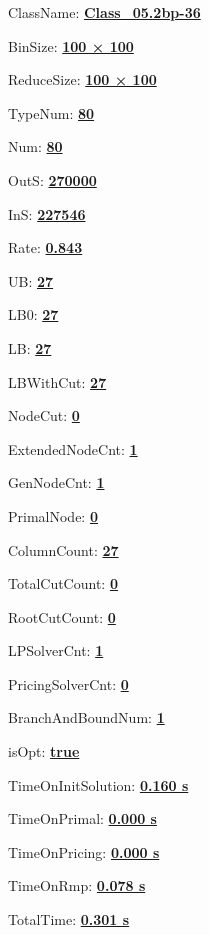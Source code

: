 \documentclass[11pt]{article}
\begin{document}
\pagestyle{empty}


ClassName: \underline{\textbf{Class_05.2bp-36}}
\par
BinSize: \underline{\textbf{100 × 100}}
\par
ReduceSize: \underline{\textbf{100 × 100}}
\par
TypeNum: \underline{\textbf{80}}
\par
Num: \underline{\textbf{80}}
\par
OutS: \underline{\textbf{270000}}
\par
InS: \underline{\textbf{227546}}
\par
Rate: \underline{\textbf{0.843}}
\par
UB: \underline{\textbf{27}}
\par
LB0: \underline{\textbf{27}}
\par
LB: \underline{\textbf{27}}
\par
LBWithCut: \underline{\textbf{27}}
\par
NodeCut: \underline{\textbf{0}}
\par
ExtendedNodeCnt: \underline{\textbf{1}}
\par
GenNodeCnt: \underline{\textbf{1}}
\par
PrimalNode: \underline{\textbf{0}}
\par
ColumnCount: \underline{\textbf{27}}
\par
TotalCutCount: \underline{\textbf{0}}
\par
RootCutCount: \underline{\textbf{0}}
\par
LPSolverCnt: \underline{\textbf{1}}
\par
PricingSolverCnt: \underline{\textbf{0}}
\par
BranchAndBoundNum: \underline{\textbf{1}}
\par
isOpt: \underline{\textbf{true}}
\par
TimeOnInitSolution: \underline{\textbf{0.160 s}}
\par
TimeOnPrimal: \underline{\textbf{0.000 s}}
\par
TimeOnPricing: \underline{\textbf{0.000 s}}
\par
TimeOnRmp: \underline{\textbf{0.078 s}}
\par
TotalTime: \underline{\textbf{0.301 s}}
\par
\newpage


\end{document}
